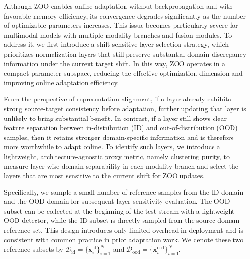 Although ZOO enables online adaptation without backpropagation and with favorable memory efficiency, its convergence degrades significantly as the number of optimizable parameters increases.
This issue becomes particularly severe for multimodal models with multiple modality branches and fusion modules.
To address it, we first introduce a shift-sensitive layer selection strategy, which prioritizes normalization layers that still preserve substantial domain-discrepancy information under the current target shift.
In this way, ZOO operates in a compact parameter subspace, reducing the effective optimization dimension and improving online adaptation efficiency.

From the perspective of representation alignment, if a layer already exhibits strong source-target consistency before adaptation, further updating that layer is unlikely to bring substantial benefit.
In contrast, if a layer still shows clear feature separation between in-distribution (ID) and out-of-distribution (OOD) samples, then it retains stronger domain-specific information and is therefore more worthwhile to adapt online.
To identify such layers, we introduce a lightweight, architecture-agnostic proxy metric, namely clustering purity, to measure layer-wise domain separability in each modality branch and select the layers that are most sensitive to the current shift for ZOO updates.

Specifically, we sample a small number of reference samples from the ID domain and the OOD domain for subsequent layer-sensitivity evaluation.
The OOD subset can be collected at the beginning of the test stream with a lightweight OOD detector, while the ID subset is directly sampled from the source-domain reference set.
This design introduces only limited overhead in deployment and is consistent with common practice in prior adaptation work.
We denote these two reference subsets by $\mathcal D_{\mathrm{id}}=\{\mathbf{x}^{\mathrm{id}}_i\}_{i=1}^{N}$ and $\mathcal D_{\mathrm{ood}}=\{\mathbf{x}^{\mathrm{ood}}_i\}_{i=1}^{N}$.

